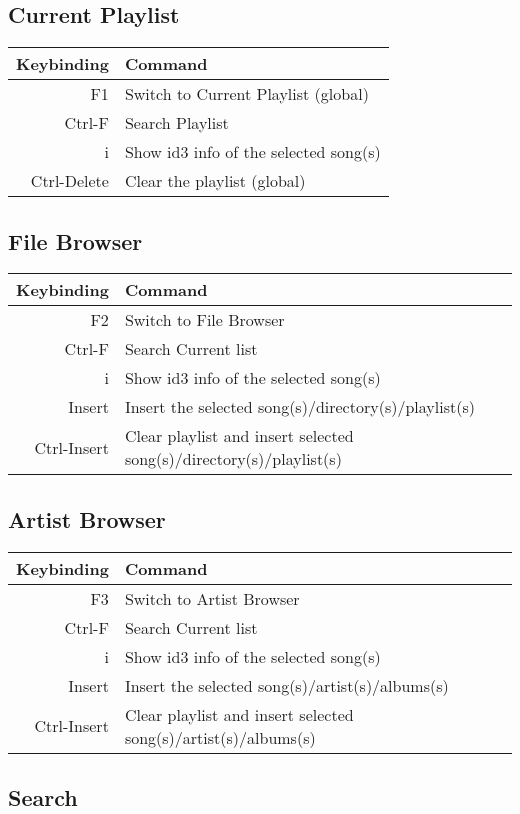 \documentclass{article}
\begin{document}
\subsection{Current Playlist}

\begin{tabular}{r|l}
Keybinding&Command\\
\hline 
F1&Switch to Current Playlist (global)\\
Ctrl-F&Search Playlist\\
i&Show id3 info of the selected song(s)\\
Ctrl-Delete&Clear the playlist (global)\\
\end{tabular}

\subsection{File Browser}

\begin{tabular}{r|l}
Keybinding&Command\\
\hline 
F2&Switch to File Browser\\
Ctrl-F&Search Current list\\
i&Show id3 info of the selected song(s)\\
Insert&Insert the selected song(s)/directory(s)/playlist(s)\\
Ctrl-Insert&Clear playlist and insert selected song(s)/directory(s)/playlist(s)\\
\end{tabular}

\subsection{Artist Browser}

\begin{tabular}{r|l}
Keybinding&Command\\
\hline 
F3&Switch to Artist Browser\\
Ctrl-F&Search Current list\\
i&Show id3 info of the selected song(s)\\
Insert&Insert the selected song(s)/artist(s)/albums(s)\\
Ctrl-Insert&Clear playlist and insert selected song(s)/artist(s)/albums(s)\\
\end{tabular}

\subsection{Search}
\end{document}
